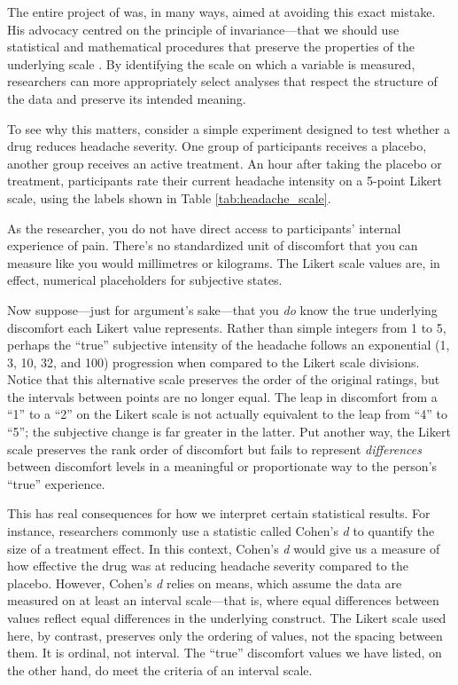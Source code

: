The entire project of \textcite{Stevens1946} was, in many ways, aimed at avoiding this exact mistake. His advocacy centred on the principle of invariance—that we should use statistical and mathematical procedures that preserve the properties of the underlying scale \parencite{Stevens1968}. By identifying the scale on which a variable is measured, researchers can more appropriately select analyses that respect the structure of the data and preserve its intended meaning.

To see why this matters, consider a simple experiment designed to test whether a drug reduces headache severity. One group of participants receives a placebo, another group receives an active treatment. An hour after taking the placebo or treatment, participants rate their current headache intensity on a 5-point Likert scale, using the labels shown in Table \ref{tab:headache_scale}.

\vspace{2em}



\vspace{1em}

\noindent
As the researcher, you do not have direct access to participants’ internal experience of pain. There's no standardized unit of discomfort that you can measure like you would millimetres or kilograms. The Likert scale values are, in effect, numerical placeholders for subjective states.

Now suppose—just for argument’s sake—that you \textit{do} know the true underlying discomfort each Likert value represents. Rather than simple integers from 1 to 5, perhaps the ``true'' subjective intensity of the headache follows an exponential (1, 3, 10, 32, and 100) progression when compared to the Likert scale divisions. Notice that this alternative scale preserves the order of the original ratings, but the intervals between points are no longer equal. The leap in discomfort from a “1” to a “2” on the Likert scale is not actually equivalent to the leap from “4” to “5”; the subjective change is far greater in the latter. Put another way, the Likert scale preserves the rank order of discomfort but fails to represent \textit{differences} between discomfort levels in a meaningful or proportionate way to the person's ``true'' experience.

This has real consequences for how we interpret certain statistical results. For instance, researchers commonly use a statistic called Cohen’s \textit{d} to quantify the size of a treatment effect. In this context, Cohen’s \textit{d} would give us a measure of how effective the drug was at reducing headache severity compared to the placebo. However, Cohen's \textit{d} relies on means, which assume the data are measured on at least an interval scale—that is, where equal differences between values reflect equal differences in the underlying construct. The Likert scale used here, by contrast, preserves only the ordering of values, not the spacing between them. It is ordinal, not interval. The ``true'' discomfort values we have listed, on the other hand, do meet the criteria of an interval scale.

